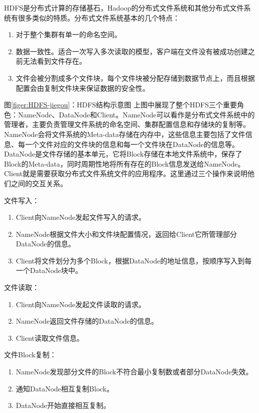 HDFS是分布式计算的存储基石，Hadoop的分布式文件系统和其他分布式文件系统有很多类似的特质。分布式文件系统基本的几个特点：

\begin{enumerate}
\item 对于整个集群有单一的命名空间。
\item 数据一致性。适合一次写入多次读取的模型，客户端在文件没有被成功创建之前无法看到文件存在。
\item 文件会被分割成多个文件块，每个文件块被分配存储到数据节点上，而且根据配置会由复制文件块来保证数据的安全性。
\end{enumerate}

图\ref{figer:HDFS-jiegou}：HDFS结构示意图
上图中展现了整个HDFS三个重要角色：NameNode、DataNode和Client。NameNode可以看作是分布式文件系统中的管理者，主要负责管理文件系统的命名空间、集群配置信息和存储块的复制等。NameNode会将文件系统的Meta-data存储在内存中，这些信息主要包括了文件信息、每一个文件对应的文件块的信息和每一个文件块在DataNode的信息等。DataNode是文件存储的基本单元，它将Block存储在本地文件系统中，保存了Block的Meta-data，同时周期性地将所有存在的Block信息发送给NameNode。Client就是需要获取分布式文件系统文件的应用程序。这里通过三个操作来说明他们之间的交互关系。

文件写入：

\begin{enumerate}
\item Client向NameNode发起文件写入的请求。
\item NameNode根据文件大小和文件块配置情况，返回给Client它所管理部分DataNode的信息。
\item Client将文件划分为多个Block，根据DataNode的地址信息，按顺序写入到每一个DataNode块中。
\end{enumerate}

文件读取：

\begin{enumerate}
\item Client向NameNode发起文件读取的请求。
\item NameNode返回文件存储的DataNode的信息。
\item Client读取文件信息。
\end{enumerate}

文件Block复制：

\begin{enumerate}
\item NameNode发现部分文件的Block不符合最小复制数或者部分DataNode失效。
\item 通知DataNode相互复制Block。
\item DataNode开始直接相互复制。
\end{enumerate}

